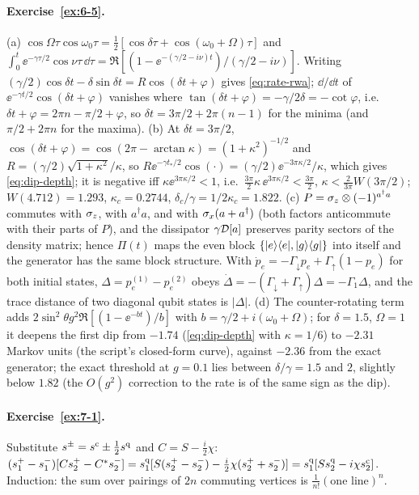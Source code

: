 \paragraph{Exercise~\ref{ex:6-5}.}
(a) $\cos\Omega\tau\cos\omega_0\tau=\tfrac12[\cos\delta\tau+\cos(\omega_0+\Omega)\tau]$ and $\int_0^t\ee^{-\gamma\tau/2}\cos\nu\tau\,\dd\tau=\Re[(1-\ee^{-(\gamma/2-i\nu)t})/(\gamma/2-i\nu)]$.
Writing $(\gamma/2)\cos\delta t-\delta\sin\delta t=R\cos(\delta t+\varphi)$ gives \cref{eq:rate-rwa}; $\dd/\dd t$ of $\ee^{-\gamma t/2}\cos(\delta t+\varphi)$ vanishes where $\tan(\delta t+\varphi)=-\gamma/2\delta=-\cot\varphi$, i.e.\ $\delta t+\varphi=2\pi n-\pi/2+\varphi$, so $\delta t=3\pi/2+2\pi(n-1)$ for the minima (and $\pi/2+2\pi n$ for the maxima).
(b) At $\delta t=3\pi/2$, $\cos(\delta t+\varphi)=\cos(2\pi-\arctan\kappa)=(1+\kappa^2)^{-1/2}$ and $R=(\gamma/2)\sqrt{1+\kappa^2}/\kappa$, so $R\ee^{-\gamma t_*/2}\cos(\cdot)=(\gamma/2)\ee^{-3\pi\kappa/2}/\kappa$, which gives \cref{eq:dip-depth}; it is negative iff $\kappa\ee^{3\pi\kappa/2}<1$, i.e.\ $\tfrac{3\pi}{2}\kappa\,\ee^{3\pi\kappa/2}<\tfrac{3\pi}{2}$, $\kappa<\tfrac{2}{3\pi}W(3\pi/2)$; $W(4.712)=1.293$, $\kappa_c=0.2744$, $\delta_c/\gamma=1/2\kappa_c=1.822$.
(c) $P=\sigma_z\otimes(-1)^{a^\dagger a}$ commutes with $\sigma_z$, with $a^\dagger a$, and with $\sigma_x(a+a^\dagger)$ (both factors anticommute with their parts of $P$), and the dissipator $\gamma\mathcal{D}[a]$ preserves parity sectors of the density matrix; hence $\Pi(t)$ maps the even block $\{|e\rangle\langle e|,|g\rangle\langle g|\}$ into itself and the generator has the same block structure.
With $\dot p_e=-\Gamma_\downarrow p_e+\Gamma_\uparrow(1-p_e)$ for both initial states, $\Delta=p_e^{(1)}-p_e^{(2)}$ obeys $\dot\Delta=-(\Gamma_\downarrow+\Gamma_\uparrow)\Delta=-\Gamma_1\Delta$, and the trace distance of two diagonal qubit states is $|\Delta|$.
(d) The counter-rotating term adds $2\sin^2\theta g^2\Re[(1-\ee^{-bt})/b]$ with $b=\gamma/2+i(\omega_0+\Omega)$; for $\delta=1.5$, $\Omega=1$ it deepens the first dip from $-1.74$ (\cref{eq:dip-depth} with $\kappa=1/6$) to $-2.31$ Markov units (the script's closed-form curve), against $-2.36$ from the exact generator; the exact threshold at $g=0.1$ lies between $\delta/\gamma=1.5$ and $2$, slightly below $1.82$ (the $O(g^2)$ correction to the rate is of the same sign as the dip).

\paragraph{Exercise~\ref{ex:7-1}.}
Substitute $s^\pm=s^{\mathrm{c}}\pm\tfrac12s^{\mathrm{q}}$ and $C=S-\tfrac i2\chi$: $(s^+_1-s^-_1)[Cs^+_2-C^*s^-_2]=s^{\mathrm{q}}_1[S(s^+_2-s^-_2)-\tfrac i2\chi(s^+_2+s^-_2)]=s^{\mathrm{q}}_1[Ss^{\mathrm{q}}_2-i\chi s^{\mathrm{c}}_2]$.
Induction: the sum over pairings of $2n$ commuting vertices is $\tfrac1{n!}(\text{one line})^n$.


